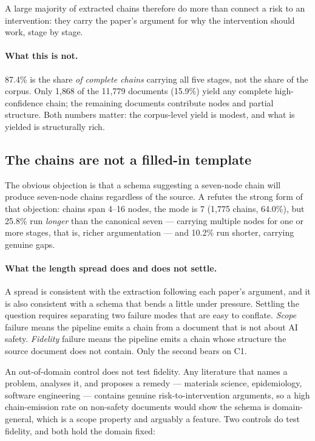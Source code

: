 \documentclass[10pt,twocolumn,letterpaper]{article}
\begin{document}
A large majority of extracted chains therefore do more than connect a risk to an
intervention: they carry the paper's argument for why the intervention should
work, stage by stage.

\paragraph{What this is not.} 87.4\% is the share \emph{of complete chains}
carrying all five stages, not the share of the corpus. Only 1{,}868 of the
11{,}779 documents (15.9\%) yield any complete high-confidence chain; the
remaining documents contribute nodes and partial structure. Both numbers matter:
the corpus-level yield is modest, and what is yielded is structurally rich.

\subsection{The chains are not a filled-in template}

The obvious objection is that a schema suggesting a seven-node chain will produce
seven-node chains regardless of the source. A refutes the
strong form of that objection: chains span 4--16 nodes, the mode is 7 (1{,}775
chains, 64.0\%), but 25.8\% run \emph{longer} than the canonical seven --- carrying
multiple nodes for one or more stages, that is, richer argumentation --- and
10.2\% run shorter, carrying genuine gaps.

\paragraph{What the length spread does and does not settle.} A spread is
consistent with the extraction following each paper's argument, and it is also
consistent with a schema that bends a little under pressure. Settling the
question requires separating two failure modes that are easy to conflate.
\emph{Scope} failure means the pipeline emits a chain from a document that is not
about AI safety. \emph{Fidelity} failure means the pipeline emits a chain whose
structure the source document does not contain. Only the second bears on C1.

An out-of-domain control does not test fidelity. Any literature that names a
problem, analyses it, and proposes a remedy --- materials science, epidemiology,
software engineering --- contains genuine risk-to-intervention arguments, so a
high chain-emission rate on non-safety documents would show the schema is
domain-general, which is a scope property and arguably a feature. Two controls do
test fidelity, and both hold the domain fixed:
\end{document}
